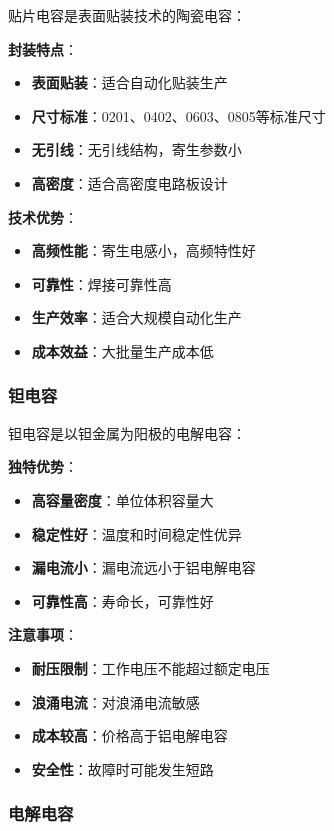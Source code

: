 \documentclass[12pt,UTF8]{ctexbook}
\begin{document}
贴片电容是表面贴装技术的陶瓷电容：

\textbf{封装特点}：
\begin{itemize}[leftmargin=3.5em]
	\item \textbf{表面贴装}：适合自动化贴装生产
	\item \textbf{尺寸标准}：0201、0402、0603、0805等标准尺寸
	\item \textbf{无引线}：无引线结构，寄生参数小
	\item \textbf{高密度}：适合高密度电路板设计
\end{itemize}

\textbf{技术优势}：
\begin{itemize}[leftmargin=3.5em]
	\item \textbf{高频性能}：寄生电感小，高频特性好
	\item \textbf{可靠性}：焊接可靠性高
	\item \textbf{生产效率}：适合大规模自动化生产
	\item \textbf{成本效益}：大批量生产成本低
\end{itemize}

\subsubsection{钽电容}

钽电容是以钽金属为阳极的电解电容：

\textbf{独特优势}：
\begin{itemize}[leftmargin=3.5em]
	\item \textbf{高容量密度}：单位体积容量大
	\item \textbf{稳定性好}：温度和时间稳定性优异
	\item \textbf{漏电流小}：漏电流远小于铝电解电容
	\item \textbf{可靠性高}：寿命长，可靠性好
\end{itemize}

\textbf{注意事项}：
\begin{itemize}[leftmargin=3.5em]
	\item \textbf{耐压限制}：工作电压不能超过额定电压
	\item \textbf{浪涌电流}：对浪涌电流敏感
	\item \textbf{成本较高}：价格高于铝电解电容
	\item \textbf{安全性}：故障时可能发生短路
\end{itemize}

\subsubsection{电解电容}
\end{document}
